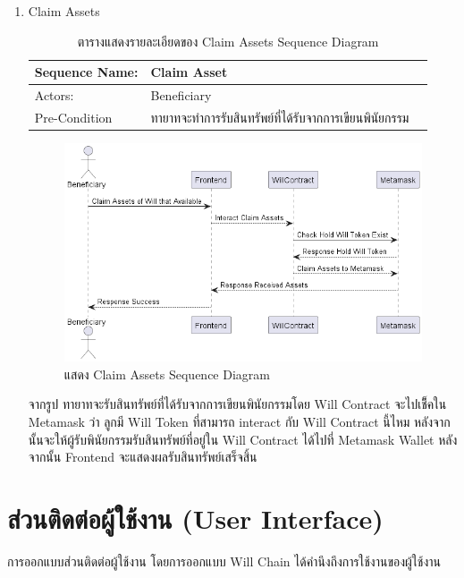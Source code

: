\documentclass[12pt,oneside,openright,a4paper]{cpe-thai-project}
\begin{document}
\begin{enumerate}[label=\thesubsection.\arabic*,leftmargin=0pt,itemindent=1.25cm]
\clearpage	
\item Claim Assets
	\begin{table}[h]
\centering
\caption{ตารางแสดงรายละเอียดของ Claim Assets Sequence Diagram}
\begin{tabularx}{\textwidth}{|l|X|X|} 
\hline
Sequence Name: & Claim Asset                                             \\ 
\hline
Actors:        & Beneficiary                                            \\ 
\hline
Pre-Condition  & ทายาทจะทำการรับสินทรัพย์ที่ได้รับจากการเขียนพินัยกรรม  \\
\hline
\end{tabularx}
\end{table}
		\begin{figure}[!thb]
			\centering
			\includegraphics[scale=0.45]{claimAssetseq}
			\caption{แสดง Claim Assets Sequence Diagram}
		\end{figure}
		\FloatBarrier
	\tab จากรูป ทายาทจะรับสินทรัพย์ที่ได้รับจากการเขียนพินัยกรรมโดย Will Contract จะไปเช็ึคใน Metamask ว่า ลูกมี Will Token ที่สามารถ interact กับ Will Contract นี้ไหม หลังจากนั้นจะให้ผู้รับพินัยกรรมรับสินทรัพย์ที่อยู่ใน Will Contract ได้ไปที่ Metamask Wallet หลังจากนั้น Frontend จะแสดงผลรับสินทรัพย์เสร็จสิ้น
	\end{enumerate}
\clearpage
\section{ส่วนติดต่อผู้ใช้งาน (User Interface)}
\tab การออกแบบส่วนติดต่อผู้ใช้งาน โดยการออกแบบ Will Chain ได้คำนึงถึงการใช้งานของผู้ใช้งาน 
\end{document}
